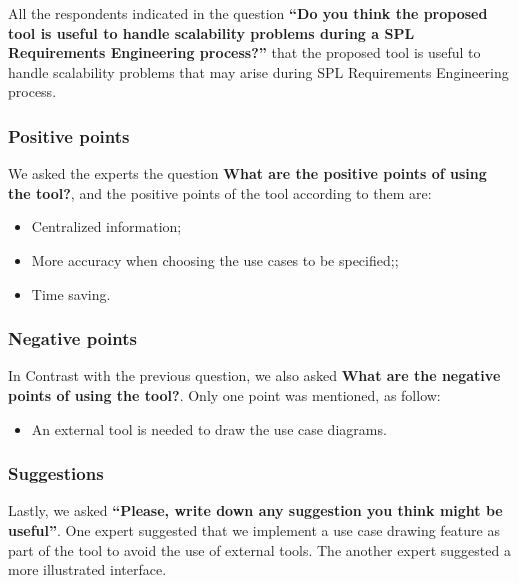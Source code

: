 All the respondents indicated in the question \textbf{“Do you think the proposed
tool is useful to handle scalability problems during a SPL Requirements
Engineering process?”} that the proposed tool is useful to handle scalability problems that may arise during  
\ac{SPL} Requirements Engineering process.

\subsubsection{Positive points}
We asked the experts the question \textbf{What are the positive points of using the tool?}, and the positive 
points of the tool according to them are:
\begin{itemize}
\item Centralized information;
\item More accuracy when choosing the use cases to be specified;;
\item Time saving.
\end{itemize}

\subsubsection{Negative points}
In Contrast with the previous question, we also asked \textbf{What are the
negative points of using the tool?}.
Only one point was mentioned, as follow:
\begin{itemize}
\item An external tool is needed to draw the use case diagrams.
\end{itemize}

\subsubsection{Suggestions}
Lastly, we asked \textbf{“Please, write down any suggestion you think might be
useful”}. One expert suggested that we implement a use case drawing feature as part of the tool 
to avoid the use of external tools. The another expert suggested a more illustrated interface.

